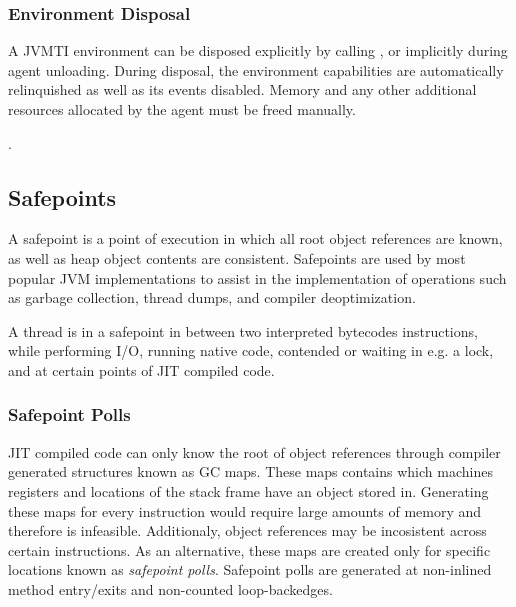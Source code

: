 \subsubsection*{Environment Disposal}

A JVMTI environment can be disposed explicitly by calling , or implicitly during agent unloading. During disposal, the environment capabilities are automatically relinquished as well as its events disabled. Memory and any other additional resources allocated by the agent must be freed manually.

.

\subsection{Safepoints}

A safepoint is a point of execution in which all root object references are known, as well as heap object contents are consistent. Safepoints are used by most popular JVM implementations to assist in the implementation of operations such as garbage collection, thread dumps, and compiler deoptimization.

A thread is in a safepoint in between two interpreted bytecodes instructions, while performing I/O, running native code, contended or waiting in e.g. a lock, and at certain points of JIT compiled code.

\subsubsection*{Safepoint Polls}

JIT compiled code can only know the root of object references through compiler generated structures known as GC maps. These maps contains which machines registers and locations of the stack frame have an object stored in. Generating these maps for every instruction would require large amounts of memory and therefore is infeasible. Additionaly, object references may be incosistent across certain instructions. As an alternative, these maps are created only for specific locations known as \emph{safepoint polls}. Safepoint polls are generated at non-inlined method entry/exits and non-counted loop-backedges.

